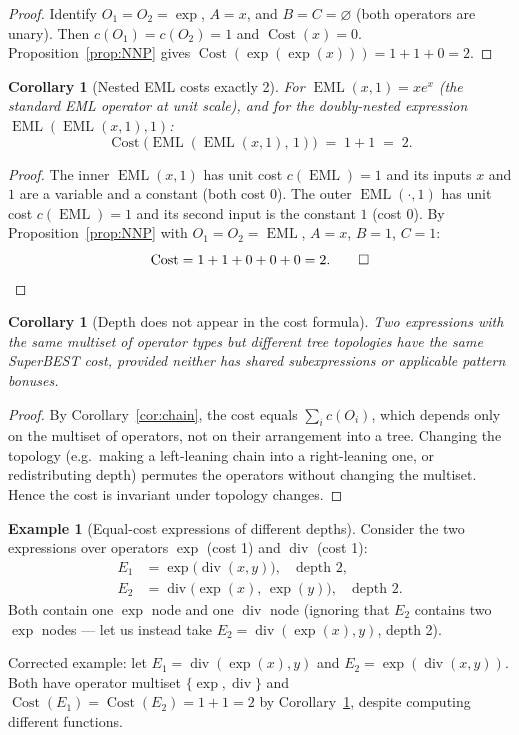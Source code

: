 \documentclass[12pt,a4paper]{article}
\newtheorem{corollary}[theorem]{Corollary}
\theoremstyle{definition}
\newtheorem{example}[theorem]{Example}
\newcommand{\EML}{\operatorname{EML}}
\newcommand{\Cost}{\operatorname{Cost}}
\newcommand{\uc}[1]{c(#1)}   %
\begin{document}
\begin{proof}
Identify $O_1 = O_2 = \exp$, $A = x$, and $B = C = \varnothing$ (both
operators are unary).  Then $\uc{O_1} = \uc{O_2} = 1$ and $\Cost(x) = 0$.
Proposition~\ref{prop:NNP} gives $\Cost(\exp(\exp(x))) = 1 + 1 + 0 = 2$.
\end{proof}

\begin{corollary}[Nested EML costs exactly 2]
\label{cor:nested-EML}
For $\EML(x,1) = xe^x$ (the standard EML operator at unit scale), and for
the doubly-nested expression $\EML(\EML(x,1),1)$:
\[
  \Cost\!\bigl(\EML(\EML(x,1),\,1)\bigr) \;=\; 1 + 1 \;=\; 2.
\]
\end{corollary}

\begin{proof}
The inner $\EML(x,1)$ has unit cost $\uc{\EML} = 1$ and its inputs $x$
and $1$ are a variable and a constant (both cost 0).  The outer
$\EML(\cdot, 1)$ has unit cost $\uc{\EML} = 1$ and its second input is
the constant $1$ (cost 0).  By Proposition~\ref{prop:NNP} with
$O_1 = O_2 = \EML$, $A = x$, $B = 1$, $C = 1$:
\[
  \Cost = 1 + 1 + 0 + 0 + 0 = 2. \qed
\]
\end{proof}

\begin{corollary}[Depth does not appear in the cost formula]
\label{cor:depth-free}
Two expressions with the same multiset of operator types but different
tree topologies have the same SuperBEST cost, provided neither has shared
subexpressions or applicable pattern bonuses.
\end{corollary}

\begin{proof}
By Corollary~\ref{cor:chain}, the cost equals $\sum_i \uc{O_i}$, which
depends only on the multiset of operators, not on their arrangement into
a tree.  Changing the topology (e.g.\ making a left-leaning chain into a
right-leaning one, or redistributing depth) permutes the operators without
changing the multiset.  Hence the cost is invariant under topology changes.
\end{proof}

\begin{example}[Equal-cost expressions of different depths]
Consider the two expressions over operators $\exp$ (cost 1) and
$\operatorname{div}$ (cost 1):
\begin{align*}
  E_1 &= \exp\!\bigl(\operatorname{div}(x,y)\bigr),
        \quad\text{depth } 2,\\
  E_2 &= \operatorname{div}\!\bigl(\exp(x),\,\exp(y)\bigr),
        \quad\text{depth } 2.
\end{align*}
Both contain one $\exp$ node and one $\operatorname{div}$ node (ignoring
that $E_2$ contains two $\exp$ nodes --- let us instead take
$E_2 = \operatorname{div}(\exp(x), y)$, depth 2).

Corrected example: let $E_1 = \operatorname{div}(\exp(x), y)$ and
$E_2 = \exp(\operatorname{div}(x, y))$.  Both have operator multiset
$\{\exp, \operatorname{div}\}$ and $\Cost(E_1) = \Cost(E_2) = 1 + 1 = 2$
by Corollary~\ref{cor:depth-free}, despite computing different functions.
\end{example}
\end{document}
